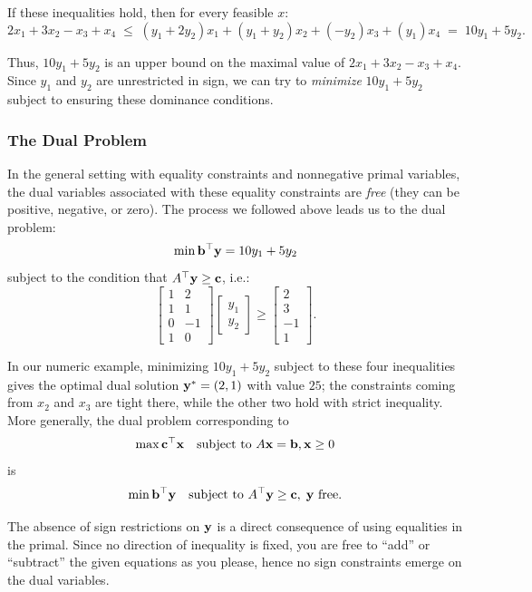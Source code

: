 If these inequalities hold, then for every feasible $x$:
\[
2x_1 + 3x_2 - x_3 + x_4 \;\leq\; (y_1+2y_2)x_1 + (y_1+y_2)x_2 + (-y_2)x_3 + (y_1)x_4 \;=\; 10y_1 + 5y_2.
\]

Thus, $10y_1 + 5y_2$ is an upper bound on the maximal value of $2x_1 + 3x_2 - x_3 + x_4$. Since $y_1$ and $y_2$ are unrestricted in sign, we can try to \emph{minimize} $10y_1 + 5y_2$ subject to ensuring these dominance conditions.

\subsubsection*{The Dual Problem}

In the general setting with equality constraints and nonnegative primal variables, the dual variables associated with these equality constraints are \emph{free} (they can be positive, negative, or zero). The process we followed above leads us to the dual problem:
\[
\min \mathbf{b}^\top \mathbf{y} = 10y_1 + 5y_2
\]
subject to the condition that $A^\top \mathbf{y} \geq \mathbf{c}$, i.e.:
\[
\begin{bmatrix}
1 & 2 \\
1 & 1 \\
0 & -1 \\
1 & 0
\end{bmatrix}
\begin{bmatrix}y_1 \\ y_2\end{bmatrix} 
\geq
\begin{bmatrix}2 \\ 3 \\ -1 \\ 1\end{bmatrix}.
\]

In our numeric example, minimizing $10y_1 + 5y_2$ subject to these four inequalities gives the optimal dual solution $\mathbf{y}^* = (2, 1)$ with value $25$; the constraints coming from $x_2$ and $x_3$ are tight there, while the other two hold with strict inequality. More generally, the dual problem corresponding to
\[
\max \mathbf{c}^\top \mathbf{x} \quad\text{subject to } A \mathbf{x} = \mathbf{b}, \mathbf{x} \geq 0
\]
is
\[
\min \mathbf{b}^\top \mathbf{y} \quad \text{subject to } A^\top \mathbf{y} \geq \mathbf{c},\; \mathbf{y} \text{ free}.
\]

The absence of sign restrictions on $\mathbf{y}$ is a direct consequence of using equalities in the primal. Since no direction of inequality is fixed, you are free to ``add'' or ``subtract'' the given equations as you please, hence no sign constraints emerge on the dual variables.

